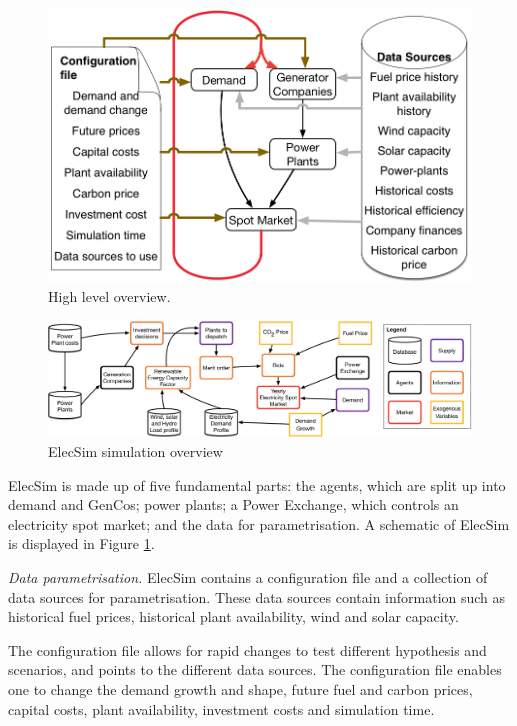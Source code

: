 \begin{figure}
	\centering
	\includegraphics[width=0.85\linewidth]{Chapter4/figures/System_overview_large.png}
	\caption{High level overview.}
	\label{fig:systemoverview}
	\vskip -6.9mm
\end{figure}

\begin{landscape}
	\begin{figure}
		\centering
		\includegraphics[width=\linewidth]{Chapter4/figures/low_level_system}
		\caption{ElecSim simulation overview}
		\label{fig:lowlevelsystem}
	\end{figure}
\end{landscape}

ElecSim is made up of five fundamental parts: the agents, which are split up into demand and GenCos; power plants; a Power Exchange, which controls an electricity spot market; and the data for parametrisation. A schematic of ElecSim is displayed in Figure \ref{fig:systemoverview}.

\textit{Data parametrisation.} ElecSim contains a configuration file and a collection of data sources for parametrisation. These data sources contain information such as historical fuel prices, historical plant availability, wind and solar capacity.

The configuration file allows for rapid changes to test different hypothesis and scenarios, and points to the different data sources. The configuration file enables one to change the demand growth and shape, future fuel and carbon prices, capital costs, plant availability, investment costs and simulation time.

